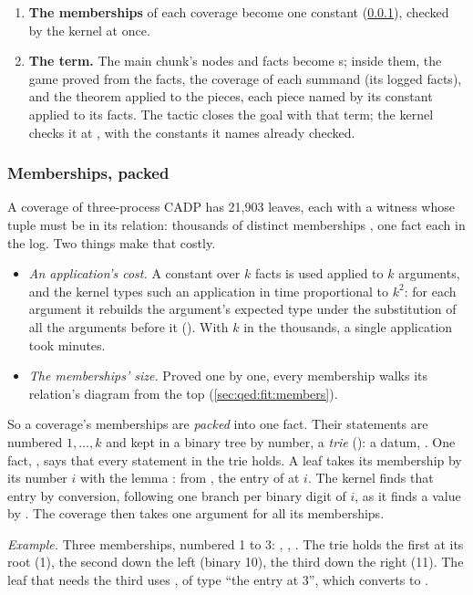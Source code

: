 \begin{enumerate}
  translator to the chunk's reader as they are written: no file.
\item \textbf{The memberships} of each coverage become one constant
  (\cref{sec:qed:packs}), checked by the kernel at once.
\item \textbf{The term.} The main chunk's nodes and facts become
  s; inside them, the game proved from the facts, the coverage
  of each summand (its logged facts), and the theorem applied to the
  pieces, each piece named by its constant applied to its facts. The
  tactic closes the goal with that term; the kernel checks it at
  , with the constants it names already checked.
\end{enumerate}

\subsubsection{Memberships, packed}\label{sec:qed:packs}

A coverage of three-process CADP has 21,903 leaves, each with a witness
whose tuple must be in its relation: thousands of distinct memberships
, one fact each in the log. Two things make that costly.
\begin{itemize}
\item \emph{An application's cost.} A constant over $k$ facts is used
  applied to $k$ arguments, and the kernel types such an application in
  time proportional to $k^2$: for each argument it rebuilds the
  argument's expected type under the substitution of all the arguments
  before it (). With $k$ in the thousands, a
  single application took minutes.
\item \emph{The memberships' size.} Proved one by one, every membership
  walks its relation's diagram from the top
  (\cref{sec:qed:fit:members}).
\end{itemize}
So a coverage's memberships are \emph{packed} into one fact. Their
statements are numbered $1, \dots, k$ and kept in a binary tree by
number, a \emph{trie} (): a datum, . One fact,
, says that every statement in the trie holds. A leaf takes
its membership by its number $i$ with the lemma :
from , the entry of  at $i$. The kernel finds that
entry by conversion, following one branch per binary digit of $i$, as it
finds a value by . The coverage then takes one argument for
all its memberships.

\emph{Example.} Three memberships, numbered 1 to 3:
, , . The trie
holds the first at its root (1), the second down the left (binary 10),
the third down the right (11). The leaf that needs the third uses
, of type ``the entry at 3'', which converts to
.


